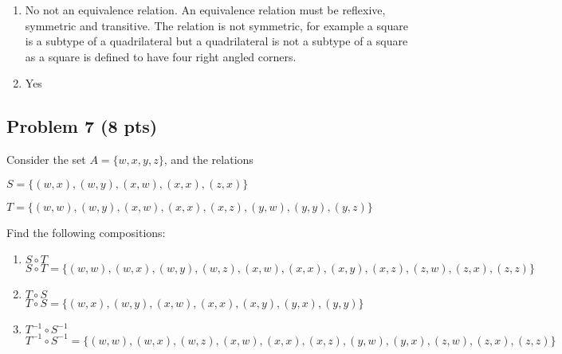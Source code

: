 \documentclass[12pt]{article}
\begin{document}
\begin{enumerate}

\item No not an equivalence relation. An equivalence relation must be reflexive, symmetric and transitive. The relation is not symmetric, for example a square is a subtype of a quadrilateral
but a quadrilateral is not a subtype of a square as a square is defined to have four right angled corners.

\item Yes
\end{enumerate}


\newpage

\subsection{Problem 7 (8 pts)}

Consider the set $A = \{ w, x, y, z \}$, and the relations

\begin{description}

\item $S = \{ (w, x), (w, y), (x, w), (x, x), (z, x) \}$

\item $T = \{ (w, w), (w, y), (x, w), (x, x),  (x, z), (y, w), (y, y), (y, z) \}$
\end{description}

\noindent Find the following compositions:

\begin{enumerate}
\item $S \circ T$\\
$S \circ T = \{ (w, w), (w, x), (w, y), (w, z), (x, w), (x, x), (x, y), (x, z), (z, w), (z, x), (z, z) \}$\\

\item $T \circ S$\\
$T \circ S = \{ (w, x), (w, y), (x, w), (x, x), (x, y), (y, x) , (y, y) \}$\\

\item $T^{-1} \circ S^{-1}$\\
$T^{-1} \circ S^{-1} = \{ (w, w), (w, x), (w, z), (x, w), (x, x), (x, z), (y, w), (y, x), (z, w), (z, x), (z, z) \}$\\
\end{enumerate}
\end{document}
